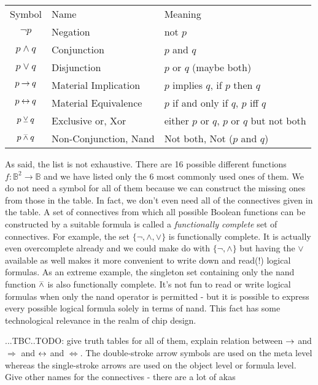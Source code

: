 \medskip
\begin{tabular}{c l l}
\label{Tab:LogicConnectives}
  Symbol           & Name                  & Meaning      \\
  $\neg p$         & Negation              & not $p$       \\
  $p \wedge q$     & Conjunction           & $p$ and $q$    \\
  $p \vee q$       & Disjunction           & $p$ or $q$ (maybe both)   \\
  $p \mathbin{\rightarrow} q$      & Material Implication  & $p$ implies $q$, if $p$ then $q$   \\  
  $p \mathbin{\leftrightarrow} q$    & Material Equivalence  & $p$ if and only if $q$, $p$ iff $q$   \\    
  $p \mathbin{\veebar} q$       & Exclusive or, Xor     & either $p$ or $q$, $p$ or $q$ but not both   \\ 
  $p \mathbin{\barwedge} q$      & Non-Conjunction, Nand & Not both, Not ($p$ and $q$)   \\   
\end{tabular}
\medskip

As said, the list is not exhaustive. There are 16 possible different functions $f: \mathbb{B}^2 \rightarrow \mathbb{B}$ and we have listed only the $6$ most commonly used ones of them. We do not need a symbol for all of them because we can construct the missing ones from those in the table. In fact, we don't even need all of the connectives given in the table. A set of connectives from which all possible Boolean functions can be constructed by a suitable formula is called a \emph{functionally complete} set of connectives. For example, the set $\{\neg, \wedge, \vee\}$ is functionally complete. It is actually even overcomplete already and we could make do with  $\{\neg, \wedge\}$ but having the $\vee$ available as well makes it more convenient to write down and read(!) logical formulas. As an extreme example, the singleton set containing only the nand function $\mathbin{\barwedge}$ is also functionally complete. It's not fun to read or write logical formulas when only the nand operator is permitted - but it is possible to express every possible logical formula solely in terms of nand. This fact has some technological relevance in the realm of chip design.

...TBC..TODO: give truth tables for all of them, explain relation between $\mathbin{\rightarrow}$ and $\Rightarrow$ and $\mathbin{\leftrightarrow}$ and $\Leftrightarrow$. The double-stroke arrow symbols are used on the meta level whereas the single-stroke arrows are used on the object level or formula level. Give other names for the connectives - there are a lot of akas

